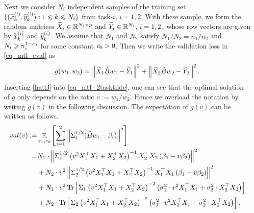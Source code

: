 Next we consider $N_i$ independent samples of the training set $\{(\widetilde x_k^{(i)},\widetilde y_k^{(i)}): 1\leqslant k \leqslant N_i\}$ from task-$i$, $i=1,2$. With these sample, we form the random matrices $\widetilde X_i \in \mathbb{R}^{N_i\times p}$ and $\widetilde Y_i\in \mathbb{R}^{N_i}$, $i=1,2,$ whose row vectors are given by $\widetilde x_k^{(i)}$ and $\widetilde y_k^{(i)}$. We assume that $N_1$ and $N_2$ satisfy $N_1/N_2=n_1/n_2$ and $N_i \geqslant n_i^{1-{\mathit{c}}_0}$ for some constant ${\mathit{c}}_0>0$. Then we write the validation loss in \eqref{eq_mtl_eval} as
\begin{align}\label{eq_mtl_2tasktilde}
	g(w_1,w_2) = \left\| \widetilde X_1 \hat B w_1 - \widetilde Y_1 \right\|^2 + \left\| \widetilde X_2 \hat B w_2 - \widetilde Y_2 \right\|^2.
\end{align}
Inserting \eqref{hatB} into \eqref{eq_mtl_2tasktilde}, one can see that the optimal solution of $g$ only depends on the ratio $v:=w_1/w_2$.
Hence we overload the notation by writing $g(v)$ in the following discussion.
The expectation of $g(v)$ can be written as follows.
\begin{align}
		val(v) :=& \mathop{\mathbb{E}}_{\varepsilon_1,{\mathit{c}}_2}\left[ \sum_{i=1}^2 \left\|\Sigma_i^{1/2}( \hat B w_i - \beta_i) \right\|^2 \right] \nonumber\\
	=&  N_1 \cdot \left\| \Sigma_1^{1/2}\left(v^2 X_1^{\top}X_1 + X_2^{\top}X_2\right)^{-1}X_2^{\top}X_2\left (\beta_1 - v\beta_2\right) \right\|^2 \nonumber \\
	&+ N_2 \cdot v^2\left\| \Sigma_2^{1/2}\left(v^2 X_1^{\top}X_1 + X_2^{\top}X_2\right)^{-1}X_1^{\top}X_1\left(\beta_1 - v\beta_2\right) \right\|^2 \nonumber \\
		&+ N_1   \cdot v^2 \operatorname{Tr}\left[\Sigma_1\left(v^2 X_1^{\top}X_1 + X_2^{\top}X_2\right)^{-2} \left(\sigma_1^2 \cdot v^2X_1^{\top}X_1 + \sigma_2^2 \cdot X_2^{\top}X_2\right)\right] \nonumber \\
		&+ N_2  \cdot \operatorname{Tr}\left[\Sigma_2\left(v^2 X_1^{\top}X_1 + X_2^{\top}X_2\right)^{-2} \left(\sigma_1^2 \cdot v^2  X_1^{\top}X_1 + \sigma_2^2  \cdot X_2^{\top}X_2\right)\right]. \label{revise_eq_val_mtl}
\end{align}

